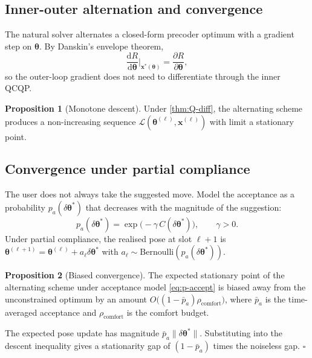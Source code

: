 \documentclass[11pt,a4paper]{article}
\theoremstyle{definition}
\newtheorem{proposition}[proposition]{Proposition}
\newcommand{\diff}{\mathrm{d}}
\newcommand{\xvec}{\mathbf{x}}
\newcommand{\thetab}{\bm{\theta}}
\begin{document}
\subsection{Inner-outer alternation and convergence}

The natural solver alternates a closed-form precoder optimum with a
gradient step on $\thetab$.  By Danskin's envelope theorem,
\begin{equation}\label{eq:envelope}
  \frac{\diff R}{\diff\thetab}\bigg|_{\xvec^*(\thetab)}
  = \frac{\partial R}{\partial\thetab},
\end{equation}
so the outer-loop gradient does not need to differentiate through
the inner QCQP.

\begin{proposition}[Monotone descent]\label{prop:descent}
Under \cref{thm:Q-diff}, the alternating scheme produces a
non-increasing sequence
$\mathcal{L}(\thetab^{(\ell)},\xvec^{(\ell)})$ with limit a
stationary point.
\end{proposition}

\subsection{Convergence under partial compliance}\label{sec:compliance}

The user does not always take the suggested move.  Model the
acceptance as a probability $p_a(\delta\thetab^*)$ that decreases
with the magnitude of the suggestion:
\begin{equation}\label{eq:p-accept}
  p_a(\delta\thetab^*)=
  \exp\!\bigl(-\gamma\,C(\delta\thetab^*)\bigr),
  \qquad\gamma>0.
\end{equation}
Under partial compliance, the realised pose at slot $\ell+1$ is
$\thetab^{(\ell+1)}=\thetab^{(\ell)}+a_\ell\delta\thetab^*$ with
$a_\ell\sim\mathrm{Bernoulli}(p_a(\delta\thetab^*))$.

\begin{proposition}[Biased convergence]\label{prop:bias}
The expected stationary point of the alternating scheme under
acceptance model \eqref{eq:p-accept} is biased away from the
unconstrained optimum by an amount
$O\bigl((1-\bar p_a)\rho_{\mathrm{comfort}}\bigr)$, where
$\bar p_a$ is the time-averaged acceptance and
$\rho_{\mathrm{comfort}}$ is the comfort budget.
\end{proposition}

\noindent The expected pose update has magnitude $\bar p_a
\|\delta\thetab^*\|$.  Substituting into the descent inequality
gives a stationarity gap of $(1-\bar p_a)$ times the noiseless
gap.  $\square$
\end{document}
